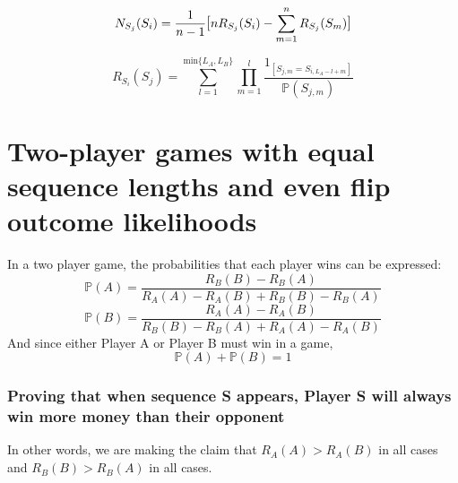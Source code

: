 \documentclass[english,12pt,a4paper,final]{article}
\begin{document}
\begin{equation}\label{Ndef}
	N_{S_j}(S_i) = \frac{1}{n-1} \mathlarger{[}nR_{S_j}(S_i) - \sum_{m=1}^{n}R_{S_j}(S_m)\mathlarger{]}
\end{equation}

\begin{equation}\label{Rdef}
	R_{S_i}(S_j) = \sum_{l=1}^{\text{min}\{L_A, L_B\}} \prod_{m=1}^{l} \frac{1_{[S_{j,m} = S_{i, L_A - l + m}]}}{\mathbb{P}(S_{j, m})}
\end{equation}

\part{Two-player games with equal sequence lengths and even flip outcome likelihoods}

In a two player game, the probabilities that each player wins can be expressed:
\begin{equation}\label{2playerAProb}
	\mathbb{P}(A)=\frac{R_B(B)-R_B(A)}{R_A(A)-R_A(B)+R_B(B)-R_B(A)}
\end{equation}
\begin{equation}\label{2playerBProb}
	\mathbb{P}(B)=\frac{R_A(A)-R_A(B)}{R_B(B)-R_B(A)+R_A(A)-R_A(B)}
\end{equation}
And since either Player A or Player B must win in a game,
\begin{equation*}
	\mathbb{P}(A)+\mathbb{P}(B)=1
\end{equation*}

\section{Proving that when sequence S appears, Player S will always win more money than their opponent}

In other words, we are making the claim that $R_A(A)>R_A(B)$ in all cases and $R_B(B)>R_B(A)$ in all cases.
\end{document}
